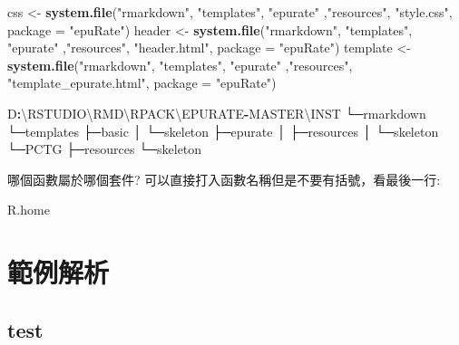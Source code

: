 \documentclass[]{book}
\newenvironment{Shaded}{\begin{snugshade}}{\end{snugshade}}
\newcommand{\KeywordTok}[1]{\textcolor[rgb]{0.13,0.29,0.53}{\textbf{#1}}}
\newcommand{\DataTypeTok}[1]{\textcolor[rgb]{0.13,0.29,0.53}{#1}}
\newcommand{\StringTok}[1]{\textcolor[rgb]{0.31,0.60,0.02}{#1}}
\newcommand{\OperatorTok}[1]{\textcolor[rgb]{0.81,0.36,0.00}{\textbf{#1}}}
\newcommand{\NormalTok}[1]{#1}
\theoremstyle{definition}
\theoremstyle{definition}
\theoremstyle{definition}
\theoremstyle{remark}
\begin{document}
\begin{Shaded}
\begin{Highlighting}[]
\NormalTok{  css <-}\StringTok{ }\KeywordTok{system.file}\NormalTok{(}\StringTok{"rmarkdown"}\NormalTok{, }\StringTok{"templates"}\NormalTok{, }\StringTok{"epurate"}\NormalTok{ ,}\StringTok{"resources"}\NormalTok{, }\StringTok{"style.css"}\NormalTok{, }\DataTypeTok{package =} \StringTok{"epuRate"}\NormalTok{)}
\NormalTok{  header <-}\StringTok{ }\KeywordTok{system.file}\NormalTok{(}\StringTok{"rmarkdown"}\NormalTok{, }\StringTok{"templates"}\NormalTok{, }\StringTok{"epurate"}\NormalTok{ ,}\StringTok{"resources"}\NormalTok{, }\StringTok{"header.html"}\NormalTok{, }\DataTypeTok{package =} \StringTok{"epuRate"}\NormalTok{)}
\NormalTok{  template <-}\StringTok{ }\KeywordTok{system.file}\NormalTok{(}\StringTok{"rmarkdown"}\NormalTok{, }\StringTok{"templates"}\NormalTok{, }\StringTok{"epurate"}\NormalTok{ ,}\StringTok{"resources"}\NormalTok{, }\StringTok{"template_epurate.html"}\NormalTok{, }\DataTypeTok{package =} \StringTok{"epuRate"}\NormalTok{)}
  
\NormalTok{D}\OperatorTok{:}\NormalTok{\textbackslash{}RSTUDIO\textbackslash{}RMD\textbackslash{}RPACK\textbackslash{}EPURATE}\OperatorTok{-}\NormalTok{MASTER\textbackslash{}INST}
\NormalTok{└─rmarkdown}
\NormalTok{    └─templates}
\NormalTok{        ├─basic}
\NormalTok{        │  └─skeleton}
\NormalTok{        ├─epurate}
\NormalTok{        │  ├─resources}
\NormalTok{        │  └─skeleton}
\NormalTok{        └─PCTG}
\NormalTok{            ├─resources}
\NormalTok{            └─skeleton}
  
  
\end{Highlighting}
\end{Shaded}

哪個函數屬於哪個套件? 可以直接打入函數名稱但是不要有括號，看最後一行:

\begin{Shaded}
\begin{Highlighting}[]
\NormalTok{R.home}
\end{Highlighting}
\end{Shaded}

\section{範例解析}

\subsection{test}\label{test}
\end{document}
